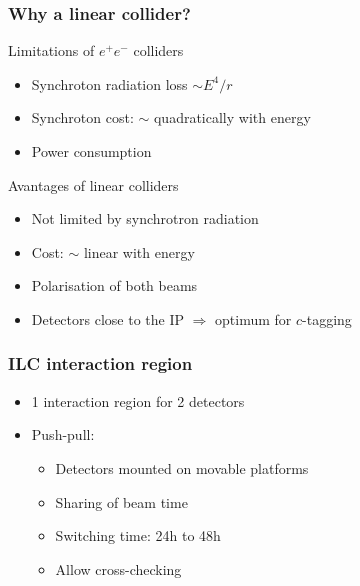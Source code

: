\documentclass{beamer}
\begin{document}
  \begin{frame}[plain]
    \frametitle{Why a linear collider?}

    \begin{block}{Limitations of $e^+e^-$ colliders}
      \begin{itemize}
        \item Synchroton radiation loss $\sim E^{4}/r$
        \item Synchroton cost: $\sim$ quadratically with energy
        \item Power consumption
      \end{itemize}
    \end{block}
    
    \begin{block}{Avantages of linear colliders}
      \begin{itemize}
        \item Not limited by synchrotron radiation
        \item Cost: $\sim$ linear with energy
        \item Polarisation of both beams
        \item Detectors close to the IP $\Rightarrow$ optimum for $c$-tagging
      \end{itemize}
    \end{block}
  \end{frame}

  \begin{frame}[plain]
    \frametitle{ILC interaction region}

    \begin{itemize}
      \item 1 interaction region for 2 detectors
      \item Push-pull:
      \begin{itemize}
        \item Detectors mounted on movable platforms
        \item Sharing of beam time
        \item Switching time: 24h to 48h
        \item Allow cross-checking
      \end{itemize}
    \end{itemize}
  \end{frame}
\end{document}
